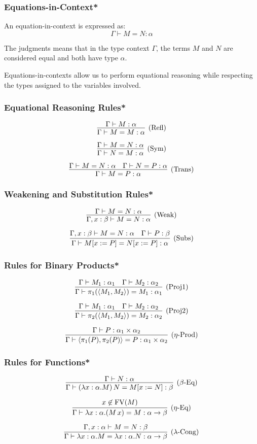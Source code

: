 \documentclass[aspectratio=169]{beamer}
\begin{document}
\begin{frame}
\frametitle{Equations-in-Context*}

An equation-in-context is expressed as:
\[
\Gamma \vdash M = N : \alpha
\]

The judgments means that in the type context $\Gamma$, the terms $M$ and $N$ are considered equal and both have type $\alpha$.

\medskip

Equations-in-contexts allow us to perform equational reasoning while respecting the types assigned to the variables involved.
\end{frame}

\begin{frame}
\frametitle{Equational Reasoning Rules*}

\[
\infer[\text{(Refl)}]{\Gamma \vdash M = M : \alpha}{\Gamma \vdash M : \alpha}
\]

\[
\infer[\text{(Sym)}]{\Gamma \vdash N = M : \alpha}{\Gamma \vdash M = N : \alpha}
\]

\[
\infer[\text{(Trans)}]{\Gamma \vdash M = P : \alpha}{\Gamma \vdash M = N : \alpha & \Gamma \vdash N = P : \alpha}
\]
\end{frame}

\begin{frame}
\frametitle{Weakening and Substitution Rules*}

\[
\infer[\text{(Weak)}]{\Gamma, x : \beta \vdash M = N : \alpha}{\Gamma \vdash M = N : \alpha}
\]

\[
\infer[\text{(Subs)}]{\Gamma \vdash M[x := P] = N[x := P] : \alpha}{\Gamma, x : \beta \vdash M = N : \alpha & \Gamma \vdash P : \beta}
\]
\end{frame}

\begin{frame}
\frametitle{Rules for Binary Products*}

\[
\infer[\text{(Proj1)}]{\Gamma \vdash \pi_1(\langle M_1, M_2 \rangle) = M_1 : \alpha_1}{\Gamma \vdash M_1 : \alpha_1 & \Gamma \vdash M_2 : \alpha_2}
\]

\[
\infer[\text{(Proj2)}]{\Gamma \vdash \pi_2(\langle M_1, M_2 \rangle) = M_2 : \alpha_2}{\Gamma \vdash M_1 : \alpha_1 & \Gamma \vdash M_2 : \alpha_2}
\]

\[
\infer[\text{($\eta$-Prod)}]{\Gamma \vdash \langle \pi_1(P), \pi_2(P) \rangle = P : \alpha_1 \times \alpha_2}{\Gamma \vdash P : \alpha_1 \times \alpha_2}
\]
\end{frame}

\begin{frame}
\frametitle{Rules for Functions*}

\[
\infer[\text{($\beta$-Eq)}]{\Gamma \vdash (\lambda x : \alpha. M) \, N = M[x := N] : \beta}{\Gamma \vdash N : \alpha}
\]

\[
\infer[\text{($\eta$-Eq)}]{\Gamma \vdash \lambda x : \alpha. (M \, x) = M : \alpha \rightarrow \beta}{x \not\in \text{FV}(M)}
\]

\[
\infer[\text{($\lambda$-Cong)}]{\Gamma \vdash \lambda x : \alpha. M = \lambda x : \alpha. N : \alpha \rightarrow \beta}{\Gamma, x : \alpha \vdash M = N : \beta}
\]

\end{frame}
\end{document}
